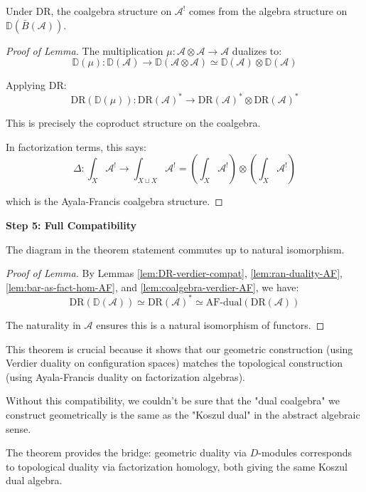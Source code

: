 \begin{lemma}\label{lem:coalgebra-verdier-AF}
Under $\text{DR}$, the coalgebra structure on $\mathcal{A}^!$ comes from the algebra 
structure on $\mathbb{D}(\bar{B}(\mathcal{A}))$.
\end{lemma}

\begin{proof}[Proof of Lemma]
The multiplication $\mu: \mathcal{A} \otimes \mathcal{A} \to \mathcal{A}$ dualizes to:
$$\mathbb{D}(\mu): \mathbb{D}(\mathcal{A}) \to \mathbb{D}(\mathcal{A} \otimes \mathcal{A}) 
\simeq \mathbb{D}(\mathcal{A}) \otimes \mathbb{D}(\mathcal{A})$$

Applying $\text{DR}$:
$$\text{DR}(\mathbb{D}(\mu)): \text{DR}(\mathcal{A})^* \to \text{DR}(\mathcal{A})^* 
\otimes \text{DR}(\mathcal{A})^*$$

This is precisely the coproduct structure on the coalgebra.

In factorization terms, this says:
$$\Delta: \int_X \mathcal{A}^! \to \int_{X \sqcup X} \mathcal{A}^! 
= \left(\int_X \mathcal{A}^!\right) \otimes \left(\int_X \mathcal{A}^!\right)$$

which is the Ayala-Francis coalgebra structure.
\end{proof}

\textbf{Step 5: Full Compatibility}

\begin{lemma}\label{lem:diagram-commutes-AF}
The diagram in the theorem statement commutes up to natural isomorphism.
\end{lemma}

\begin{proof}[Proof of Lemma]
By Lemmas \ref{lem:DR-verdier-compat}, \ref{lem:ran-duality-AF}, \ref{lem:bar-as-fact-hom-AF}, and 
\ref{lem:coalgebra-verdier-AF}, we have:
$$\text{DR}(\mathbb{D}(\mathcal{A})) \simeq \text{DR}(\mathcal{A})^* 
\simeq \text{AF-dual}(\text{DR}(\mathcal{A}))$$

The naturality in $\mathcal{A}$ ensures this is a natural isomorphism of functors.
\end{proof}

\begin{remark}\label{rem:importance-koszul-AF}
This theorem is crucial because it shows that our geometric construction (using 
Verdier duality on configuration spaces) matches the topological construction (using 
Ayala-Francis duality on factorization algebras).

Without this compatibility, we couldn't be sure that the "dual coalgebra" we construct 
geometrically is the same as the "Koszul dual" in the abstract algebraic sense.

The theorem provides the bridge: geometric duality via $D$-modules corresponds to 
topological duality via factorization homology, both giving the same Koszul dual algebra.
\end{remark}

